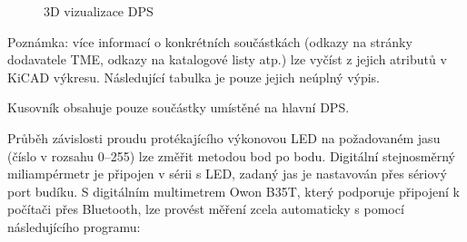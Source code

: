 



\begin{figure}[htbp]
    \centering
    \caption{3D vizualizace DPS}
    \label{fig:PCB 3d}
\end{figure}



\clearpage






\clearpage
{}
\label{app:BOM}
Poznámka: více informací o konkrétních součástkách (odkazy na stránky
dodavatele TME, odkazy na katalogové listy atp.) lze vyčíst z jejich atributů
v KiCAD výkresu. Následující tabulka je pouze jejich neúplný výpis.

Kusovník obsahuje pouze součástky umístěné na hlavní DPS.




\clearpage
{}
\label{app:ambient}
Průběh závislosti proudu protékajícího výkonovou LED na požadovaném jasu (číslo
v rozsahu \numrange{0}{255}) lze změřit metodou bod po bodu. Digitální
stejnosměrný miliampérmetr je připojen v sérii s LED, zadaný jas je nastavován
přes sériový port budíku. S digitálním multimetrem Owon B35T, který podporuje
připojení k počítači přes Bluetooth, lze provést měření zcela automaticky
s pomocí následujícího programu:


